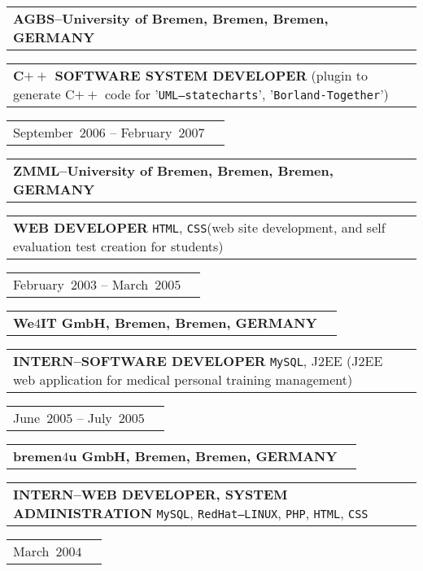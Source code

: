 \documentclass[9pt,a4paper]{article} %
\makeatletter
\newcommand{\headerrow}[2]
{\begin{tabular*}{\linewidth}{l@{\extracolsep{\fill}}r}
	#1 &
	#2 \\
\end{tabular*}}
\newcommand{\headerrowONE}[1]{\headerrow{#1}{}}
\newcommand{\css}{\texttt{CSS}\xspace}
\newcommand{\php}{\texttt{PHP}\xspace}
\newcommand{\mysql}{\texttt{MySQL}\xspace}
\newcommand{\redhat}{\texttt{RedHat--LINUX}\xspace}
\newcommand{\html}{\texttt{HTML}\xspace}
\newcommand{\jtwoee}{J$2$EE\xspace}
\newcommand{\cplusplus}{C$++$\xspace}
\newcommand{\cvitemdate}[2]{#1~$#2$\xspace}
\newcommand{\cvitempositionheld}[1]{\textbf{#1}\xspace}
\makeatother
\begin{document}
\vspace{0.3em}

\headerrowONE{\textbf{AGBS--University of Bremen, Bremen, Bremen, GERMANY}}	
\headerrowONE{\cvitempositionheld{\cplusplus SOFTWARE SYSTEM DEVELOPER}
(plugin to generate \cplusplus code for '\texttt{UML--statecharts}',
'\texttt{Borland-Together}')}
\headerrowONE{\cvitemdate{September}{2006} -- \cvitemdate{February}{2007}}	

\vspace{0.3em}

\headerrowONE{\textbf{ZMML--University of Bremen, Bremen, Bremen, GERMANY}}	
\headerrowONE{\cvitempositionheld{WEB DEVELOPER} \html, \css (web site development,
and self evaluation test creation for students)}
\headerrowONE{\cvitemdate{February}{2003} -- \cvitemdate{March}{2005}}	

\vspace{0.3em}

\headerrowONE{\textbf{We$4$IT GmbH, Bremen, Bremen, GERMANY}}	
\headerrowONE{\cvitempositionheld{INTERN--SOFTWARE DEVELOPER} \mysql, \jtwoee
(\jtwoee web application for medical personal training management)}
\headerrowONE{\cvitemdate{June}{2005} -- \cvitemdate{July}{2005}}
	
\vspace{0.3em}

\headerrowONE{\textbf{bremen$4$u GmbH, Bremen, Bremen, GERMANY}}	
\headerrowONE{\cvitempositionheld{INTERN--WEB DEVELOPER, SYSTEM ADMINISTRATION} \mysql, \redhat, \php,
\html, \css}
\headerrowONE{\cvitemdate{March}{2004}}	

\vspace{2em}
	
\end{document}
